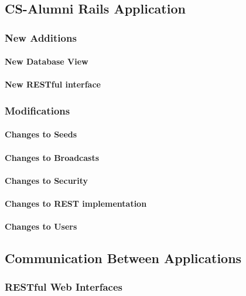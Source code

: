 \documentclass{article}
\begin{document}
\subsection{CS-Alumni Rails Application}

\subsubsection{New Additions}

\paragraph{New Database View}

\paragraph{New RESTful interface}

\subsubsection{Modifications}

\paragraph{Changes to Seeds}

\paragraph{Changes to Broadcasts}

\paragraph{Changes to Security}

\paragraph{Changes to REST implementation}

\paragraph{Changes to Users}

\subsection{Communication Between Applications}

\subsubsection{RESTful Web Interfaces}
\end{document}
